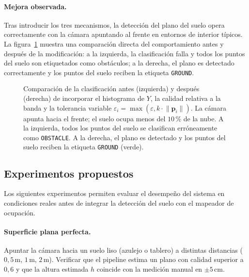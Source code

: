 \paragraph{Mejora observada.}
Tras introducir los tres mecanismos, la detección del plano del suelo opera
correctamente con la cámara apuntando al frente en entornos de interior
típicos. La figura~\ref{fig:lm-ground-robustness} muestra una comparación
directa del comportamiento antes y después de la modificación: a la
izquierda, la clasificación falla y todos los puntos del suelo son etiquetados
como obstáculos; a la derecha, el plano es detectado correctamente y los
puntos del suelo reciben la etiqueta \texttt{GROUND}.

\begin{figure}[htbp]
  \centering
  \caption{Comparación de la clasificación antes (izquierda) y después (derecha)
           de incorporar el histograma de $Y$, la calidad relativa a la banda y
           la tolerancia variable $\varepsilon_i = \max(\varepsilon, k\cdot\lVert\mathbf{p}_i\rVert)$.
           La cámara apunta hacia el frente; el suelo ocupa menos del $10\,$\% de la nube.
           A la izquierda, todos los puntos del suelo se clasifican erróneamente como
           \texttt{OBSTACLE}. A la derecha, el plano es detectado y los puntos
           del suelo reciben la etiqueta \texttt{GROUND} (verde).}
  \label{fig:lm-ground-robustness}
\end{figure}

\subsection{Experimentos propuestos}

Los siguientes experimentos permiten evaluar el desempeño del sistema en
condiciones reales antes de integrar la detección del suelo con el mapeador
de ocupación.

\paragraph{Superficie plana perfecta.}
Apuntar la cámara hacia un suelo liso (azulejo o tablero) a distintas
distancias ($0{,}5\,\text{m}$, $1\,\text{m}$, $2\,\text{m}$). Verificar
que el pipeline estima un plano con calidad superior a $0{,}6$ y que la
altura estimada $h$ coincide con la medición manual en $\pm 5\,\text{cm}$.

